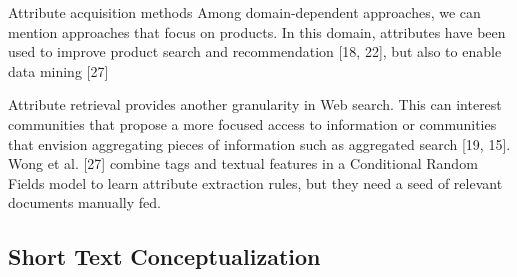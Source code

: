 Attribute acquisition methods
Among domain-dependent approaches, we can mention approaches that focus on products. In this domain, attributes have been used to improve product search and recommendation [18, 22], but also to enable data mining [27]

Attribute retrieval provides another granularity in Web
search. This can interest communities that propose a more
focused access to information or communities that envision
aggregating pieces of information such as aggregated search
[19, 15].
Wong et al. [27]
combine tags and textual features in a Conditional Random
Fields model to learn attribute extraction rules, but they
need a seed of relevant documents manually fed.

\subsection{Short Text Conceptualization}
